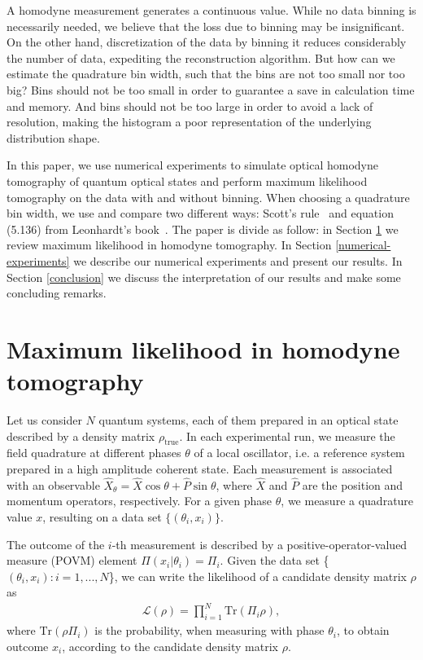\documentclass[
reprint,
superscriptaddress,
showpacs,
amsmath,
amssymb,
aps,
pra,
longbibliography
]{revtex4-1}
\newcommand{\rhotrue}{\rho_{\text{true}}}
\begin{document}
A homodyne measurement generates a continuous value. While no data binning is necessarily needed, we believe that the loss due to binning may be insignificant. On the other hand, discretization of the data by binning it reduces considerably the number of data, expediting the reconstruction algorithm. But how can we estimate the quadrature bin width, such that the bins are not too small nor too big? Bins should not be too small in order to guarantee a save in calculation time and memory. And bins should not be too large in order to avoid a lack of resolution, making the histogram a poor representation 
of the underlying distribution shape.
 
In this paper, we use numerical experiments to simulate optical homodyne tomography of quantum optical states and perform maximum likelihood tomography on the data with and without binning. When choosing a quadrature bin width, we use and compare two different ways: Scott's rule~\cite{Scott2010} and equation (5.136) from Leonhardt's book~\cite{Leonhardt1997}. The paper is divide as follow: in Section \ref{MLE} we review maximum likelihood in homodyne tomography.  In Section \ref{numerical-experiments} we describe our numerical experiments and present our results. In Section \ref{conclusion} we discuss the interpretation of our results and make some concluding remarks.


\section{Maximum likelihood in homodyne tomography}
\label{MLE}
Let us consider $N$ quantum systems, each of them prepared in an optical state described by a density matrix $\rhotrue$. In each experimental run, we measure the field quadrature at different phases $\theta$ of a local oscillator, i.e. a reference system prepared in a high amplitude coherent state. Each measurement is associated with an observable $\hat{X}_{\theta} = \hat{X} \cos \theta + \hat{P} \sin \theta$, where $\hat{X}$ and $\hat{P}$ are the position and momentum operators, respectively. For a given phase $\theta$, we measure a quadrature value $x$, resulting on a data set $\{(\theta_i, x_i)\}$.

The outcome of the $i$-th measurement is described by a positive-operator-valued measure (POVM) element $\Pi (x_i|\theta_i) = \Pi_i$. Given the data set \{$(\theta_{i},
x_i): i = 1, ..., N$\}, we can write the likelihood of a candidate density matrix $\rho$ as
\begin{eqnarray}
\mathcal{L} (\rho)= \prod_{i=1}^{N} \mathrm{Tr} (\Pi_i \rho),
\label{eq-likelihood}
\end{eqnarray}
where $\mathrm{Tr}(\rho \Pi_i)$ is the probability, when measuring with phase $\theta_i$, to obtain outcome $x_i$, according to the candidate density matrix $\rho$.
\end{document}
